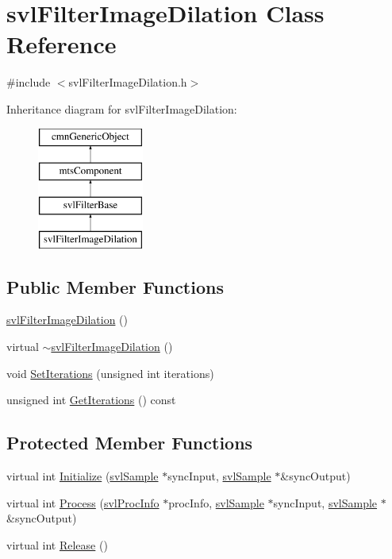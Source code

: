 \hypertarget{classsvl_filter_image_dilation}{}\section{svl\+Filter\+Image\+Dilation Class Reference}
\label{classsvl_filter_image_dilation}


{\ttfamily \#include $<$svl\+Filter\+Image\+Dilation.\+h$>$}

Inheritance diagram for svl\+Filter\+Image\+Dilation\+:\begin{figure}[H]
\begin{center}
\leavevmode
\includegraphics[height=4.000000cm]{d3/d43/classsvl_filter_image_dilation}
\end{center}
\end{figure}
\subsection*{Public Member Functions}
\begin{DoxyCompactItemize}
\item 
\hyperlink{classsvl_filter_image_dilation_a34e1cf5925b81f9418624db014ed81bd}{svl\+Filter\+Image\+Dilation} ()
\item 
virtual \hyperlink{classsvl_filter_image_dilation_a7ebb1f17d844fe952bcc0f33119d0564}{$\sim$svl\+Filter\+Image\+Dilation} ()
\item 
void \hyperlink{classsvl_filter_image_dilation_a481098af2cfd506dbd903034c9ee2134}{Set\+Iterations} (unsigned int iterations)
\item 
unsigned int \hyperlink{classsvl_filter_image_dilation_aa931be14712581cd2d7bfa1c19cfc59f}{Get\+Iterations} () const 
\end{DoxyCompactItemize}
\subsection*{Protected Member Functions}
\begin{DoxyCompactItemize}
\item 
virtual int \hyperlink{classsvl_filter_image_dilation_ad7511de97eeedeefb89c8f59ce589c46}{Initialize} (\hyperlink{classsvl_sample}{svl\+Sample} $\ast$sync\+Input, \hyperlink{classsvl_sample}{svl\+Sample} $\ast$\&sync\+Output)
\item 
virtual int \hyperlink{classsvl_filter_image_dilation_a384dfb3791e42d43076ec90842e2a80a}{Process} (\hyperlink{structsvl_proc_info}{svl\+Proc\+Info} $\ast$proc\+Info, \hyperlink{classsvl_sample}{svl\+Sample} $\ast$sync\+Input, \hyperlink{classsvl_sample}{svl\+Sample} $\ast$\&sync\+Output)
\item 
virtual int \hyperlink{classsvl_filter_image_dilation_a020c8d14b164b276bdb782ae48196f8b}{Release} ()
\end{DoxyCompactItemize}
